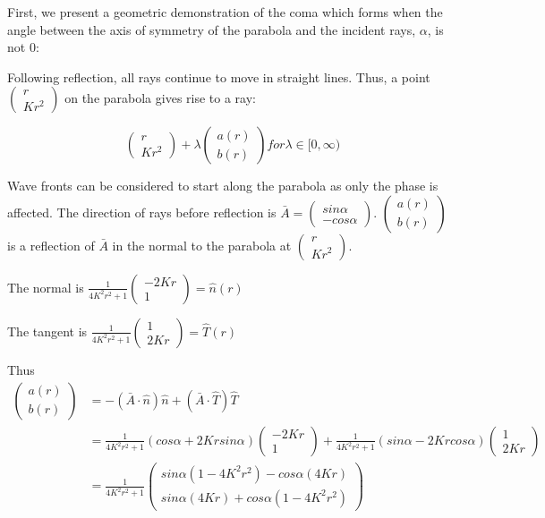 \documentclass{article}
\begin{document}
    First, we present a geometric demonstration of the coma which forms when the angle between the axis of symmetry of the parabola and the incident rays, \(\alpha\), is not 0:

    Following reflection, all rays continue to move in straight lines. Thus, a point \(\begin{pmatrix} r \\ Kr^2 \end{pmatrix}\) on the parabola gives rise to a ray:

    \[\begin{pmatrix} r \\ Kr^2 \end{pmatrix} + \lambda \begin{pmatrix} a(r) \\ b(r) \end{pmatrix}for \lambda \in [0,\infty)\]
    
    Wave fronts can be considered to start along the parabola as only the phase is affected. The direction of rays before reflection is \( \bar{A} = \begin{pmatrix} sin\alpha \\ -cos\alpha \end{pmatrix}\). \(\begin{pmatrix} a(r) \\ b(r) \end{pmatrix}\) is a reflection of \(\bar{A}\) in the normal to the parabola at \(\begin{pmatrix} r \\ Kr^2 \end{pmatrix}\).

    The normal is \(\frac{1}{4K^2r^2+1} \begin{pmatrix} -2Kr \\ 1 \end{pmatrix} = \hat{n}(r)\)

    The tangent is \(\frac{1}{4K^2r^2+1} \begin{pmatrix} 1 \\ 2Kr \end{pmatrix} = \hat{T}(r)\)

    Thus \begin{align*}
    \begin{pmatrix} a(r) \\ b(r) \end{pmatrix} &= -(\bar{A} \cdot \hat{n})\hat{n} + (\bar{A} \cdot \hat{T})\hat{T}
    \\ &= \frac{1}{4K^2r^2+1} (cos\alpha + 2Krsin\alpha) \begin{pmatrix} -2Kr \\ 1 \end{pmatrix} + \frac{1}{4K^2r^2+1} (sin\alpha - 2Krcos\alpha) \begin{pmatrix} 1 \\ 2Kr \end{pmatrix}
    \\ &= \frac{1}{4K^2r^2+1} \begin{pmatrix} sin\alpha (1-4K^2r^2) - cos\alpha(4Kr) \\ sin\alpha(4Kr) + cos\alpha(1-4K^2r^2) \end{pmatrix}
    \end{align*}
\end{document}
